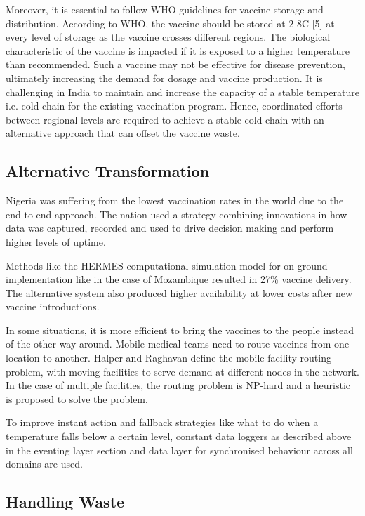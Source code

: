 \documentclass{article}
\begin{document}
Moreover, it is essential to follow WHO guidelines for vaccine storage and distribution. According to WHO, the vaccine should be stored at 2-8\degree C [5] at every level of storage as the vaccine crosses different regions. The biological characteristic of the vaccine is impacted if it is exposed to a higher temperature than recommended. Such a vaccine may not be effective for disease prevention, ultimately increasing the demand for dosage and vaccine production. It is challenging in India to maintain and increase the capacity of a stable temperature i.e. cold chain for the existing vaccination program. Hence, coordinated efforts between regional levels are required to achieve a stable cold chain with an alternative approach that can offset the vaccine waste. 
 
 \subsection{Alternative Transformation}
 Nigeria was suffering from the lowest vaccination rates in the world due to the end-to-end approach. The nation used a strategy combining innovations in how data was captured, recorded and used to drive decision making and perform higher levels of uptime.\cite{sarley2017transforming}
 
 Methods like the HERMES computational simulation model for on-ground implementation like in the case of Mozambique resulted in 27\% vaccine delivery. The alternative system also produced higher availability at lower costs after new vaccine introductions.\cite{LEE20164998}
 
 In some situations, it is more efficient to bring the vaccines to the people instead of the other way around. Mobile medical teams need to route vaccines from one location to another. Halper and Raghavan define the mobile facility routing problem, with moving facilities to serve demand at different nodes in the network. In the case of multiple facilities, the routing problem is NP-hard and a heuristic is proposed to solve the problem.\cite{duijzer2018literature}
 
 To improve instant action and fallback strategies like what to do when a temperature falls below a certain level, constant data loggers as described above in the eventing layer section and data layer for synchronised behaviour across all domains are used.
 
 \subsection{Handling Waste}
 
\end{document}
